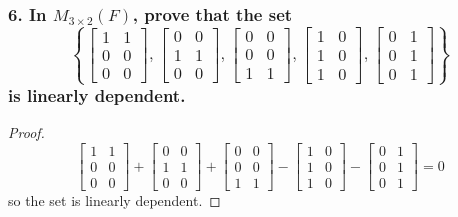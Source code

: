 \documentclass{article}
\begin{document}
\subsubsection*{6. In $M_{3\times2}(F)$, prove that the set \[\left\{\begin{bmatrix}
	1 & 1 \\ 0 & 0 \\ 0 & 0
\end{bmatrix}, \begin{bmatrix}
	0 & 0 \\ 1 & 1 \\ 0 & 0
\end{bmatrix}, \begin{bmatrix}
	0 & 0 \\ 0 & 0 \\ 1 & 1
\end{bmatrix}, \begin{bmatrix}
	1 & 0 \\ 1 & 0 \\ 1 & 0
\end{bmatrix}, \begin{bmatrix}
	0 & 1 \\ 0 & 1 \\ 0 & 1
\end{bmatrix}\right\}\] is linearly dependent.}
\begin{proof}
	\[
		\begin{bmatrix}
			1 & 1 \\ 0 & 0 \\ 0 & 0
		\end{bmatrix} + \begin{bmatrix}
			0 & 0 \\ 1 & 1 \\ 0 & 0
		\end{bmatrix} + \begin{bmatrix}
			0 & 0 \\ 0 & 0 \\ 1 & 1
		\end{bmatrix} - \begin{bmatrix}
			1 & 0 \\ 1 & 0 \\ 1 & 0
		\end{bmatrix} - \begin{bmatrix}
			0 & 1 \\ 0 & 1 \\ 0 & 1
		\end{bmatrix} = 0
	\] so the set is linearly dependent.
\end{proof}
\end{document}
